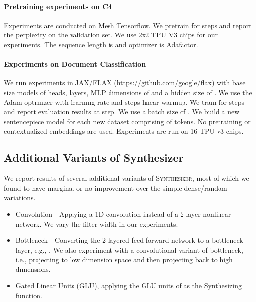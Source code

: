 \documentclass{article} \usepackage{iclr2021_conference,times}
\begin{document}
\paragraph{Pretraining experiments on C4}
Experiments are conducted on Mesh Tensorflow. We pretrain for  steps and report the perplexity on the validation set. We use 2x2 TPU V3 chips for our experiments. The sequence length is  and optimizer is Adafactor.

\paragraph{Experiments on Document Classification}
We run experiments in JAX/FLAX (\url{https://github.com/google/flax}) with base size models of  heads,  layers, MLP dimensions of  and a hidden size of . We use the Adam optimizer with learning rate  and  steps linear warmup. We train for  steps and report evaluation results at  step. We use a batch size of . We build a new sentencepiece model for each new dataset comprising of  tokens. No pretraining or contextualized embeddings are used. Experiments are run on 16 TPU v3 chips. 

\subsection{Additional Variants of Synthesizer}
We report results of several additional variants of \textsc{Synthesizer}, most of which we found to have marginal or no improvement over the simple dense/random variations.
\begin{itemize}
    \item Convolution - Applying a 1D convolution instead of a 2 layer nonlinear network. We vary the filter width in our experiments.
    \item Bottleneck - Converting the 2 layered feed forward network to a bottleneck layer, e.g., . We also experiment with a convolutional variant of bottleneck, i.e., projecting to low dimension space and then projecting back to high dimensions.
    \item Gated Linear Units (GLU), applying the GLU units of \citep{dauphin2017language} as the Synthesizing function.
\end{itemize}
\end{document}
